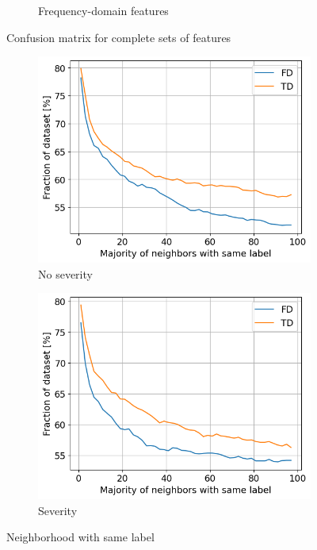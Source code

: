 \begin{figure}[h]
\begin{subfigure}[b]{0.49\textwidth}
        \caption{Frequency-domain features}
    \end{subfigure}
    \caption{Confusion matrix for complete sets of features }
\end{figure}

\begin{figure}[h]
    \centering
    \begin{subfigure}[b]{0.49\textwidth}
        \includegraphics[width=\textwidth]{assets/results/all-features/neighborhood.png}
        \caption{No severity}
    \end{subfigure}
    \hfill
    \begin{subfigure}[b]{0.49\textwidth}
        \includegraphics[width=\textwidth]{assets/results/all-features/neighborhood-severity.png}
        \caption{Severity}
    \end{subfigure}
    \caption{Neighborhood with same label}
\end{figure}

